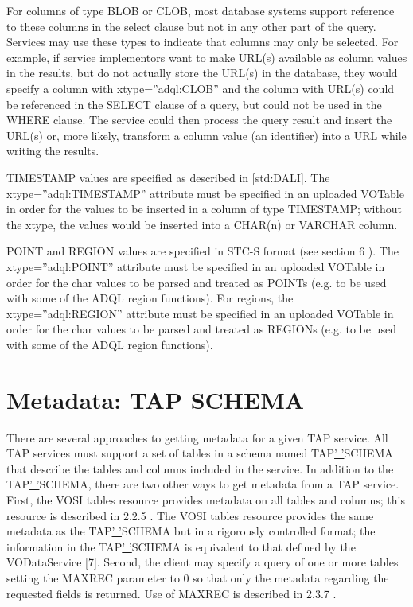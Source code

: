\documentclass[11pt,a4paper]{ivoa}
\begin{document}
{For columns of type BLOB or CLOB, most database systems support reference to 
these columns in the select clause but not in any other part of the query. 
Services may use these types to indicate that columns may only be selected. For 
example, if service implementors want to make URL(s) available as column values 
in the results, but do not actually store the URL(s) in the database, they would 
specify a column with xtype=”adql:CLOB” and the column with URL(s) could be 
referenced in the SELECT clause of a query, but could not be used in the WHERE 
clause. The service could then process the query result and insert the URL(s) 
or, more likely, transform a column value (an identifier) into a URL while 
writing the results.

TIMESTAMP values are specified as described in [std:DALI]. The 
xtype=”adql:TIMESTAMP” attribute must be specified in an uploaded VOTable in 
order for the values to be inserted in a column of type TIMESTAMP; without the 
xtype, the values would be inserted into a CHAR(n) or VARCHAR column.

POINT and REGION values are specified in STC-S format (see section 6 ). The 
xtype=”adql:POINT” attribute must be specified in an uploaded VOTable in order 
for the char values to be parsed and treated as POINTs (e.g. to be used with 
some of the ADQL region functions). For regions, the xtype=”adql:REGION” 
attribute must be specified in an uploaded VOTable in order for the char values 
to be parsed and treated as REGIONs (e.g. to be used with some of the ADQL 
region functions).

\section{Metadata: TAP SCHEMA}

There are several approaches to getting metadata for a given TAP service. All 
TAP services must support a set of tables in a schema named 
TAP\underline{' '}SCHEMA that describe the tables and columns included in the 
service. In addition to the TAP\underline{' '}SCHEMA, there are two other ways 
to get metadata from a TAP service. First, the VOSI tables resource provides 
metadata on all tables and columns; this resource is described in 2.2.5 . The 
VOSI tables resource provides the same metadata as the TAP\underline{' '}SCHEMA 
but in a rigorously controlled format; the information in the 
TAP\underline{' '}SCHEMA is equivalent to that defined by the  VODataService 
[7]. Second, the client may specify a query of one or more tables setting the 
MAXREC parameter to 0 so that only the metadata regarding the requested fields 
is returned. Use of MAXREC is described in 2.3.7 .

}
\end{document}
